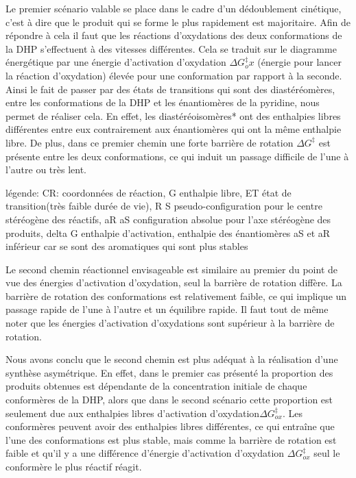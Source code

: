 \documentclass{article}
\begin{document}
Le premier scénario valable se place dans le cadre d’un dédoublement cinétique, c’est à dire que le produit qui se forme le plus rapidement est majoritaire. Afin de répondre à cela il faut que les réactions d'oxydations des deux conformations de la DHP s'effectuent à des vitesses différentes. Cela se traduit sur le diagramme énergétique par une énergie d’activation d’oxydation $\Delta G^\ddagger_ox$ (énergie pour lancer la réaction d’oxydation) élevée pour une conformation par rapport à la seconde. Ainsi le fait de passer par des états de transitions qui sont des diastéréomères, entre les conformations de la DHP et les énantiomères de la pyridine, nous permet de réaliser cela. En effet, les diastéréoisomères* ont des enthalpies libres différentes entre eux contrairement aux énantiomères qui ont la même enthalpie libre. De plus, dans ce premier chemin une forte barrière de rotation $\Delta G^\ddagger$ est présente entre les deux conformations, ce qui induit un passage difficile de l'une à l'autre ou très lent.
\medbreak

légende: CR: coordonnées de réaction, G enthalpie libre, ET état de transition(très faible durée de vie), R S pseudo-configuration pour le centre stéréogène des réactifs, aR aS configuration absolue pour l’axe stéréogène des produits, delta G enthalpie d’activation, enthalpie des énantiomères aS et aR inférieur car se sont des aromatiques qui sont plus stables
   
\medbreak
  



Le second chemin réactionnel envisageable est similaire au premier du point de vue des énergies d’activation d’oxydation, seul la barrière de rotation diffère. La barrière de rotation des conformations est relativement faible, ce qui implique un passage rapide de l'une à l'autre et un équilibre rapide. Il faut tout de même noter que les énergies d’activation d’oxydations sont supérieur à la barrière de rotation.
\medbreak

Nous avons conclu que le second chemin est plus adéquat à la réalisation d’une synthèse asymétrique. En effet, dans le premier cas présenté la proportion des produits obtenues est dépendante de la concentration initiale de chaque conformères de la DHP, alors que dans le second scénario cette proportion est seulement due aux enthalpies libres d'activation d’oxydation$\Delta G^\ddagger_{ox}$. Les conformères peuvent avoir des enthalpies libres différentes, ce qui entraîne que l'une des conformations est plus stable, mais comme la barrière de rotation est faible et qu'il y a une différence d’énergie d’activation d’oxydation $\Delta G^\ddagger_{ox}$ seul le conformère le plus réactif réagit.
\medbreak
\end{document}
